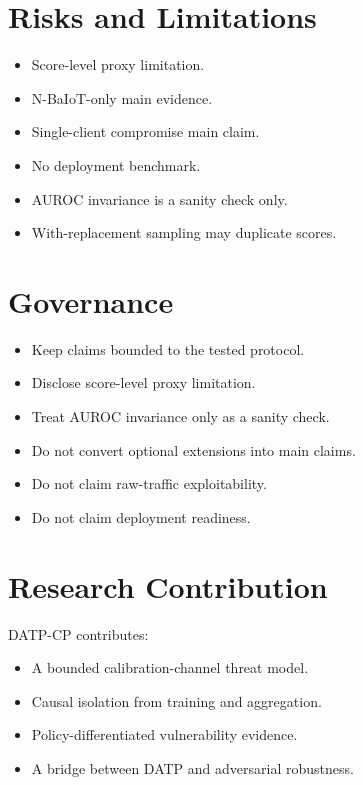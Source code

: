 \vspace{0.5em}

\begin{minipage}[t]{0.48\linewidth}
\section{Risks and Limitations}
\begin{itemize}
  \item Score-level proxy limitation.
  \item N-BaIoT-only main evidence.
  \item Single-client compromise main claim.
  \item No deployment benchmark.
  \item AUROC invariance is a sanity check only.
  \item With-replacement sampling may duplicate scores.
\end{itemize}
\end{minipage}%
\hfill
\begin{minipage}[t]{0.48\linewidth}
\section{Governance}
\begin{itemize}
  \item Keep claims bounded to the tested protocol.
  \item Disclose score-level proxy limitation.
  \item Treat AUROC invariance only as a sanity check.
  \item Do not convert optional extensions into main claims.
  \item Do not claim raw-traffic exploitability.
  \item Do not claim deployment readiness.
\end{itemize}
\end{minipage}

\vspace{0.6em}

\section{Research Contribution}

\begin{tcolorbox}[callout]
DATP-CP contributes:
\begin{itemize}
  \item A bounded calibration-channel threat model.
  \item Causal isolation from training and aggregation.
  \item Policy-differentiated vulnerability evidence.
  \item A bridge between DATP and adversarial robustness.
\end{itemize}
\end{tcolorbox}
